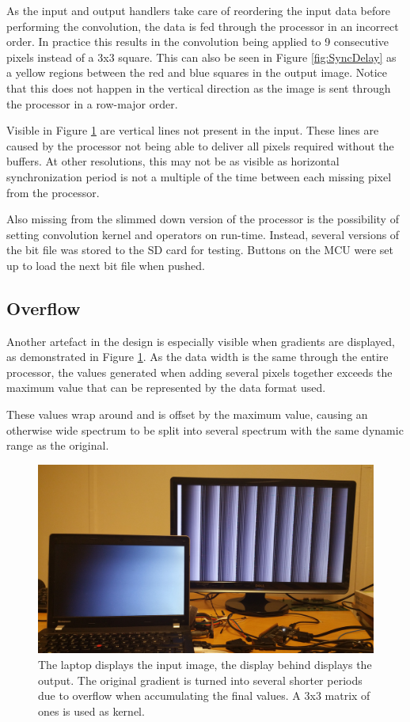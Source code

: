 As the input and output handlers take care of reordering the input data before performing the convolution, the data is fed through the processor in an incorrect order.
In practice this results in the convolution being applied to 9 consecutive pixels instead of a 3x3 square.
This can also be seen in Figure \ref{fig:SyncDelay} as a yellow regions between the red and blue squares in the output image.
Notice that this does not happen in the vertical direction as the image is sent through the processor in a row-major order.

Visible in Figure \ref{fig:Overflow} are vertical lines not present in the input.
These lines are caused by the processor not being able to deliver all pixels required without the buffers.
At other resolutions, this may not be as visible as horizontal synchronization period is not a multiple of the time between each missing pixel from the processor.

Also missing from the slimmed down version of the processor is the possibility of setting convolution kernel and operators on run-time.
Instead, several versions of the bit file was stored to the SD card for testing.
Buttons on the MCU were set up to load the next bit file when pushed.

\subsection{Overflow}
Another artefact in the design is especially visible when gradients are displayed, as demonstrated in Figure \ref{fig:Overflow}.
As the data width is the same through the entire processor, the values generated when adding several pixels together exceeds the maximum value that can be represented by the data format used.

These values wrap around and is offset by the maximum value, causing an otherwise wide spectrum to be split into several spectrum with the same dynamic range as the original.

\begin{figure}
    \centering
    \includegraphics[width=14cm]{img/gradient_test}
    \caption[Gradient Output]{
        The laptop displays the input image, the display behind displays the output.
        The original gradient is turned into several shorter periods due to overflow when accumulating the final values.
        A 3x3 matrix of ones is used as kernel.
    }
    \label{fig:Overflow}

\end{figure}


